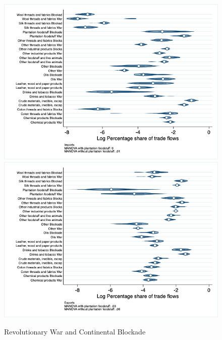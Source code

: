 \documentclass[12pt,a4paper,notitlepage,english]{article}
\begin{document}
\begin{figure}
\centering
\caption{Revolutionary War and Continental Blockade}
\label{rev_block_nat_distr}
\includegraphics[scale=.4]{rev_block_nat_distr_Isitc}
\includegraphics[scale=.4]{rev_block_nat_distr_Xsitc}
\end{figure}
\end{document}
